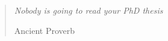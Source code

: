 \documentclass[officiallayout,final]{unihelcompling}
\renewcommand{\:}{\mbox{${\rm :}$}}
\begin{document}


\def\arraystretch{1.2}

\clearpage
%
\frontmatter
\maketitle
\vspace*{\fill}
\thispagestyle{empty} 
\begin{quotation}
\em %
Nobody is going to read your PhD thesis

\medskip
\raggedleft
Ancient Proverb
\end{quotation}
\vspace*{\fill}
\onehalfspacing

%

\mainmatter

\tableofcontents
\end{document}
